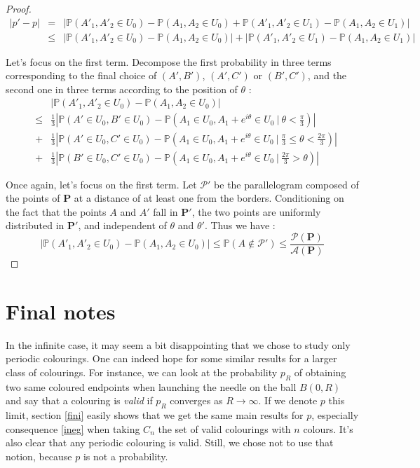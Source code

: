 \documentclass[a4paper,11pt]{article}
\theoremstyle{definition}
\theoremstyle{remark}
\begin{document}
\begin{proof}

\begin{eqnarray*}
|p' - p| 
  &=& | \mathbb{P}(A'_1 , A'_2 \in U_0) - \mathbb{P}(A_1 , A_2 \in U_0) + \mathbb{P}(A'_1 , A'_2 \in U_1) - \mathbb{P}(A_1 , A_2 \in U_1) | \\
  &\leq& | \mathbb{P}(A'_1 , A'_2 \in U_0) - \mathbb{P}(A_1 , A_2 \in U_0) | + | \mathbb{P}(A'_1 , A'_2 \in U_1) - \mathbb{P}(A_1 , A_2 \in U_1) | 
\end{eqnarray*}

Let's focus on the first term. 
Decompose the first probability in three terms corresponding to the final choice of $(A',B')$, $(A',C')$ or $(B',C')$, and the second one in three terms according to the position of $\theta$ :
\begin{eqnarray*}
& & \left| \mathbb{P}(A'_1 , A'_2 \in U_0) - \mathbb{P}(A_1 , A_2 \in U_0) \right| \\
&\leq& \frac{1}{3} \left| \mathbb{P}(A' \in U_0 , B' \in U_0) - \mathbb{P}(A_1 \in U_0 , A_1 + e^{i \theta} \in U_0 \ |\  \theta < \frac{\pi}{3} ) \right| \\
&+& \frac{1}{3} \left| \mathbb{P}(A' \in U_0 , C' \in U_0) - \mathbb{P}(A_1 \in U_0 , A_1 + e^{i \theta} \in U_0 \ |\  \frac{\pi}{3} \leq \theta < \frac{2 \pi}{3} ) \right| \\
&+& \frac{1}{3} \left| \mathbb{P}(B' \in U_0 ,C' \in U_0) - \mathbb{P}(A_1 \in U_0 , A_1 + e^{i \theta} \in U_0 \ | \  \frac{2 \pi}{3} > \theta ) \right|
\end{eqnarray*}

Once again, let's focus on the first term. Let $\mathcal{P'}$ be the parallelogram  composed of the points of  $\mathbf{P}$ at a distance of at least one from the borders. Conditioning on the fact that the points $A$ and $A'$ fall in $\mathbf{P'}$, the two points are uniformly distributed in $\mathbf{P'}$, and independent of $\theta$ and $\theta'$. Thus we have : 
$$ \left| \mathbb{P}(A'_1 , A'_2 \in U_0) - \mathbb{P}(A_1 , A_2 \in U_0) \right| \leq \mathbb P(A \not \in \mathcal{P'}) \leq \frac{\mathcal{P}(\mathbf{P})}{\mathcal{A}(\mathbf{P})} $$


\end{proof}

\section{Final notes}
In the infinite case, it may seem a bit disappointing that we chose to study only periodic colourings. One can indeed hope for some similar results for a larger class of colourings. For instance, we can look at the probability $p_R$ of obtaining two same coloured endpoints when launching the needle on the ball $B(0,R)$ and say that a colouring is \emph{valid} if $p_R$ converges as $R \rightarrow \infty$. If we denote $p$ this limit, section \ref{fini} easily shows that we get the same main results for $p$, especially consequence \ref{ineg} when taking $C_n$ the set of valid colourings with $n$ colours. It's also clear that any periodic colouring is valid. Still, we chose not to use that notion, because $p$ is not a probability.
\end{document}
